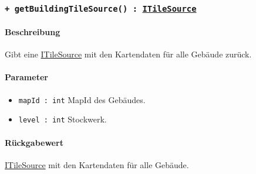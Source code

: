 \subsubsection*{\texttt{+ getBuildingTileSource() : \href{https://osmdroid.github.io/osmdroid/javadocAll/org/osmdroid/tileprovider/tilesource/ITileSource.html}
{ITileSource}}}%
\paragraph*{Beschreibung}
Gibt eine \href{https://osmdroid.github.io/osmdroid/javadocAll/org/osmdroid/tileprovider/tilesource/ITileSource.html}
{ITileSource} mit den Kartendaten für alle Gebäude zurück.
\paragraph*{Parameter}
\begin{itemize}
    \item \texttt{mapId : int} MapId des Gebäudes.
    \item \texttt{level : int} Stockwerk.
\end{itemize}
\paragraph*{Rückgabewert}
\href{https://osmdroid.github.io/osmdroid/javadocAll/org/osmdroid/tileprovider/tilesource/ITileSource.html}
{ITileSource} mit den Kartendaten für alle Gebäude.